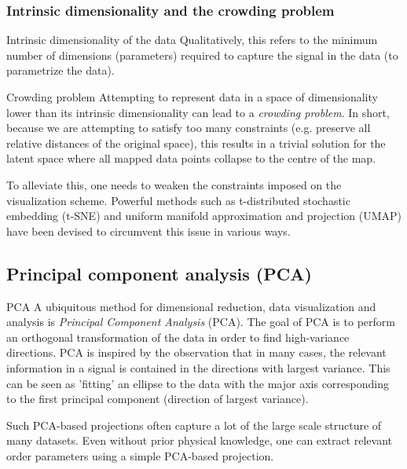 \subsubsection{Intrinsic dimensionality and the crowding problem}
\begin{mybox}{Intrinsic dimensionality of the data}
	Qualitatively, this refers to the minimum number of dimensions (parameters) required to capture the signal in the data (to parametrize the data). 
\end{mybox}
\begin{mybox}{Crowding problem}
	Attempting to represent data in a space of dimensionality lower than its intrinsic dimensionality can lead to a \emph{crowding problem}. In short, because we are attempting to satisfy too many constraints (e.g. preserve all relative distances of the original space), this results in a trivial solution for the latent space where all mapped data points collapse to the centre of the map.
\end{mybox}
To alleviate this, one needs to weaken the constraints imposed on the visualization scheme. Powerful methods such as t-distributed stochastic embedding (t-SNE) and uniform manifold approximation and projection (UMAP) have been devised to circumvent this issue in various ways.


\subsection{Principal component analysis (PCA)}
\label{subsec:dimRedPCA}
\begin{mybox}{PCA}
A ubiquitous method for dimensional reduction, data visualization and analysis is \emph{Principal Component Analysis} (PCA). The goal of PCA is to perform an orthogonal transformation of the data in order to find high-variance directions. PCA is inspired by the observation that in many cases, the relevant information in a signal is contained in the directions with largest variance. This can be seen as ’fitting’ an ellipse to the data with the major axis corresponding to the first principal component (direction of largest variance).
\end{mybox}
Such PCA-based projections often capture a lot of the large scale structure of many datasets. Even without prior physical knowledge, one can extract relevant order parameters using a simple PCA-based projection.
